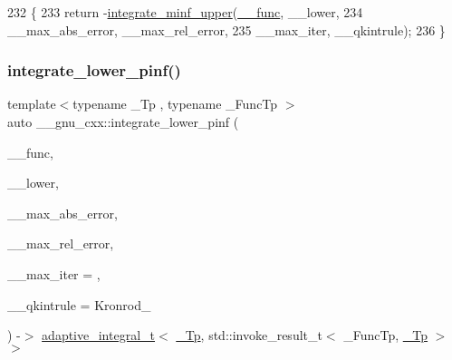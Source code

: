 \begin{DoxyCode}
232     \{
233       \textcolor{keywordflow}{return} -\hyperlink{namespace____gnu__cxx_ac452c1c660d47daf605eda7b395ba497}{integrate\_minf\_upper}(\hyperlink{namespace____gnu__cxx_af2b2f0c7a2ae72b922b1afefae5a65b2}{\_\_func}, \_\_lower,
234                                    \_\_max\_abs\_error, \_\_max\_rel\_error,
235                                    \_\_max\_iter, \_\_qkintrule);
236     \}
\end{DoxyCode}
\mbox{\label{namespace____gnu__cxx_ad1f0fd43b7a498328749e924085b4fc1}} 
\subsubsection{\texorpdfstring{integrate\+\_\+lower\+\_\+pinf()}{integrate\_lower\_pinf()}}
{\footnotesize\ttfamily template$<$typename \+\_\+\+Tp , typename \+\_\+\+Func\+Tp $>$ \\
auto \+\_\+\+\_\+gnu\+\_\+cxx\+::integrate\+\_\+lower\+\_\+pinf (\begin{DoxyParamCaption}\item[{\+\_\+\+Func\+Tp}]{\+\_\+\+\_\+func,  }\item[{\hyperlink{namespace____gnu__cxx_a3b19a9c800ca194374ef9172290f7d79}{\+\_\+\+Tp}}]{\+\_\+\+\_\+lower,  }\item[{\hyperlink{namespace____gnu__cxx_a3b19a9c800ca194374ef9172290f7d79}{\+\_\+\+Tp}}]{\+\_\+\+\_\+max\+\_\+abs\+\_\+error,  }\item[{\hyperlink{namespace____gnu__cxx_a3b19a9c800ca194374ef9172290f7d79}{\+\_\+\+Tp}}]{\+\_\+\+\_\+max\+\_\+rel\+\_\+error,  }\item[{std\+::size\+\_\+t}]{\+\_\+\+\_\+max\+\_\+iter = {},  }\item[{Kronrod\+\_\+\+Rule}]{\+\_\+\+\_\+qkintrule = {\ttfamily Kronrod\+\_} }\end{DoxyParamCaption}) -\/$>$  \hyperlink{struct____gnu__cxx_1_1adaptive__integral__t}{adaptive\+\_\+integral\+\_\+t}$<$ \hyperlink{namespace____gnu__cxx_a3b19a9c800ca194374ef9172290f7d79}{\+\_\+\+Tp}, std\+::invoke\+\_\+result\+\_\+t$<$ \+\_\+\+Func\+Tp, \hyperlink{namespace____gnu__cxx_a3b19a9c800ca194374ef9172290f7d79}{\+\_\+\+Tp} $>$$>$}

